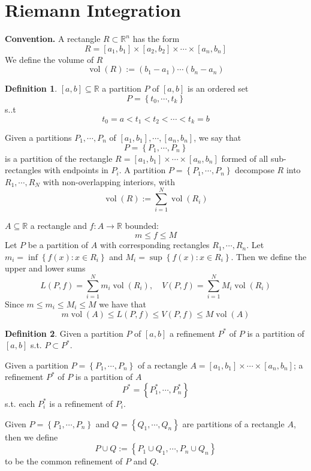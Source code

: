 \documentclass[11pt,a4paper]{article}
\theoremstyle{definition}
\newtheorem{definition}{Definition}[section]
\theoremstyle{plain}
\theoremstyle{remark}
\newcommand{\R}{\mathbb{R}}
\renewcommand{\set}[1]{\left\{ #1 \right\}}
\begin{document}
\section{Riemann Integration} 
\textbf{Convention.} A rectangle $R \subset \R^n$ has the form 
$$R = [a_1, b_1] \times [a_2, b_2] \times \cdots \times [a_n, b_n]$$
We define the volume of $R$ 
$$\operatorname{vol} (R) := (b_1 - a_1) \cdots (b_n - a_n)$$

\begin{definition}
    $[a,b] \subseteq \R$ a partition $P$ of $[a,b]$ is an ordered set 
    $$P = \set{t_0, \cdots, t_k}$$
    s..t 
    $$t_0 = a < t_1 < t_2 < \cdots < t_k = b$$

    Given a partitions $P_1, \cdots, P_n$ of $[a_1, b_1], \cdots, [a_n, b_n]$, we say that 
    $$P = \set{P_1, \cdots, P_n}$$
    is a partition of the rectangle $R = [a_1, b_1] \times \cdots \times [a_n, b_n]$ formed of all sub-rectangles with endpoints in $P_i$.
    A partition $P = \set{P_1, \cdots, P_n}$ decompose $R$ into $R_1, \cdots, R_N$ with non-overlapping interiors, with 
    $$\operatorname{vol} (R) := \sum_{i=1}^N \operatorname{vol} (R_i)$$

    $A \subseteq \R$ a rectangle and $f \colon A \to \R$ bounded: 
    $$m \le f \le M$$ 
    Let $P$ be a partition of $A$ with corresponding rectangles $R_1, \cdots, R_n$. 
    Let $m_i = \inf \set{f(x) \colon x \in R_i}$ and $M_i = \sup \set{f(x) \colon x \in R_i}$. Then we define the upper and lower sums 
    $$L(P, f) = \sum_{i=1}^N m_i \operatorname{vol} (R_i), \quad V(P, f) = \sum_{i=1}^N M_i \operatorname{vol} (R_i)$$
    Since $m \le m_i \le M_i \le M$ we have that 
    $$m \operatorname{vol} (A) \le L(P, f) \le V(P, f) \le M \operatorname{vol} (A)$$
\end{definition}

\begin{definition}
    Given a partition $P$ of $[a,b]$ a refinement $P^*$ of $P$ is a partition of $[a,b]$ s.t. 
    $P \subset P^*$. 

    Given a partition $P = \set{P_1, \cdots, P_n}$ of a rectangle $A = [a_1, b_1] \times \cdots \times [a_n, b_n]$; a 
    refinement $P^*$ of $P$ is a partition of $A$ 
    $$P^* = \set{P_1^*, \cdots, P^*_n}$$
    s.t. each $P_i^*$ is a refinement of $P_i$. 

    Given $P = \set{P_1, \cdots, P_n}$ and $Q = \set{Q_1, \cdots, Q_n}$ are partitions of a rectangle $A$, then we define 
    $$P \cup Q := \set{P_1 \cup Q_1, \cdots, P_n \cup Q_n}$$
    to be the common refinement of $P$ and $Q$.
\end{definition}
\end{document}
